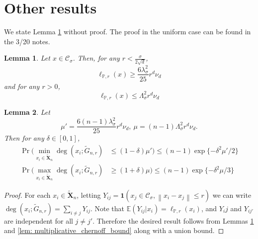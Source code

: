 \documentclass{article}
\newcommand{\norm}[1]{\left\lVert#1\right\rVert}
\newcommand{\Xbf}{\mathbf{X}}
\newcommand{\Cset}{\mathcal{C}}
\newcommand{\Csig}{\Cset_{\sigma}}
\newcommand{\Pbb}{\mathbb{P}}
\newcommand{\Ebb}{\mathbb{E}}
\newcommand{\1}{\mathbf{1}}
\theoremstyle{alden}
\theoremstyle{aldenthm}
\newtheorem{lemma}{Lemma}
\theoremstyle{remark}
\begin{document}
\section{Other results}
\label{sec: other_results}

We state Lemma \ref{lem: local_conductance} without proof. The proof in the uniform case can be found in the 3/20 notes.

\begin{lemma}
	\label{lem: local_conductance}
	Let $x \in \Csig$. Then, for any $r < \frac{\sigma}{2\sqrt{d}}$,
	\begin{equation*}
	\ell_{\Pbb,r}(x) \geq \frac{6\lambda_{\sigma}^2}{25} r^d \nu_d
	\end{equation*}
	and for any $r > 0$,
	\begin{equation*}
	\ell_{\Pbb,r}(x) \leq \Lambda_{\sigma}^2 r^d \nu_d
	\end{equation*}
\end{lemma}

\begin{lemma}
	\label{lem: max_degree} 
	Let 
	\begin{equation*}
	\mu' = \frac{6(n - 1)\lambda_{\sigma}^2}{25} r^d \nu_d,~ \mu = (n-1) \Lambda_{\sigma}^2 r^d \nu_d.
	\end{equation*}
	Then for any $\delta \in [0,1]$,
	\begin{align*}
	\Pr \biggl(\min_{x_i \in \widetilde{\Xbf}_n} \deg(x_i; \widetilde{G}_{n,r}) & \leq (1 - \delta) \mu' \biggr) \leq (n - 1)\exp\{-\delta^2 \mu' / 2\} \\
	\Pr \biggl(\max_{x_i \in \widetilde{\Xbf}_n} \deg(x_i; \widetilde{G}_{n,r}) & \geq (1 + \delta) \mu \biggr) \leq (n - 1)\exp\{-\delta^2 \mu / 3\}
	\end{align*}
\end{lemma}
\begin{proof}
	For each $x_i \in \widetilde{\Xbf}_n$, letting $Y_{ij} =  \1(x_j \in \Csig, \norm{x_i - x_j} \leq r)$ we can write $\deg(x_i; \widetilde{G}_{n,r}) = \sum_{i \neq j} Y_{ij}$. Note that $\Ebb(Y_{ij} | x_i) = \ell_{\Pbb,r}(x_i)$, and $Y_ij$ and $Y_{ij'}$ are independent for all $j \neq j'$. Therefore the desired result follows from Lemmas \ref{lem: local_conductance} and \ref{lem: multiplicative_chernoff_bound} along with a union bound. 
\end{proof}
\end{document}
